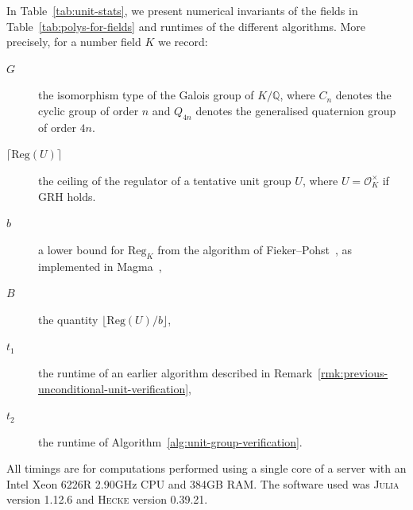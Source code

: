 \documentclass[12pt, a4paper, usenames]{amsart}
\newcommand{\Q}{\mathbb{Q}}
\theoremstyle{plain}
\theoremstyle{remark}
\theoremstyle{definition}
\begin{document}
In Table~\ref{tab:unit-stats}, we present numerical invariants of the fields 
in Table~\ref{tab:polys-for-fields}
and runtimes of the different algorithms. More precisely, for a number field $K$ we record:
\begin{description}
\item[$G$ ] the isomorphism type of the Galois group of $K/\Q$, where $C_{n}$ denotes the cyclic group of order $n$ and $Q_{4n}$ denotes the generalised quaternion group of order $4n$.
\item[$\lceil \mathrm{Reg}(U) \rceil$ ] the ceiling of the regulator of a tentative unit group $U$, where $U=\mathcal{O}_{K}^{\times}$ if GRH holds.
\item[$b$ ] a lower bound for $\mathrm{Reg}_K$ from the algorithm of 
Fieker--Pohst~\cite{MR2441075}, as implemented in Magma~\cite{MR1484478},
\item[$B$ ] the quantity $\lfloor \mathrm{Reg}(U)/b\rfloor$,
\item[$t_{1}$ ] the runtime of an earlier algorithm described in 
Remark~\ref{rmk:previous-unconditional-unit-verification},
\item[$t_{2}$ ] the runtime of Algorithm~\ref{alg:unit-group-verification}.
\end{description}

All timings are for computations performed using 
a single core of  a server with an Intel Xeon 6226R 2.90GHz CPU and 384GB RAM.
The software used was \textsc{Julia} version 1.12.6 and \textsc{Hecke} version 0.39.21.
\end{document}
